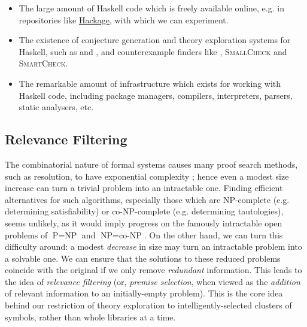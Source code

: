 \begin{itemize}

\item The large amount of Haskell code which is freely available online, e.g. in repositories like \href{http://hackage.haskell.org}{Hackage}, with which we can experiment.

\item The existence of conjecture generation and theory exploration systems for Haskell, such as \qspec{} and \hspec{}, and counterexample finders like \qcheck{}, \textsc{SmallCheck} and \textsc{SmartCheck}.

\item The remarkable amount of infrastructure which exists for working with Haskell code, including package managers, compilers, interpreters, parsers, static analysers, etc.

\end{itemize}

\iffalse
TODO
\subsection{Conjecture Generation}

The task of \emph{conjecture generation} lies at the heart of theory exploration, and

\subsubsection{Lemma generation}

\fi

\subsection{Relevance Filtering}
\label{sec:relevance}

The combinatorial nature of formal systems causes many proof search methods, such as resolution, to have exponential complexity \citep{haken1985intractability}; hence even a modest size increase can turn a trivial problem into an intractable one. Finding efficient alternatives for such algorithms, especially those which are NP-complete (e.g. determining satisfiability) or co-NP-complete (e.g. determining tautologies), seems unlikely, as it would imply progress on the famously intractable open problems of $\text{P} = \text{NP}$ and $\text{NP} = \text{co-NP}$. On the other hand, we can turn this difficulty around: a modest \emph{decrease} in size may turn an intractable problem into a solvable one. We can ensure that the solutions to these reduced problems coincide with the original if we only remove \emph{redundant} information. This leads to the idea of \emph{relevance filtering} (or, \emph{premise selection}, when viewed as the \emph{addition} of relevant information to an initially-empty problem). This is the core idea behind our restriction of theory exploration to intelligently-selected clusters of symbols, rather than whole libraries at a time.

